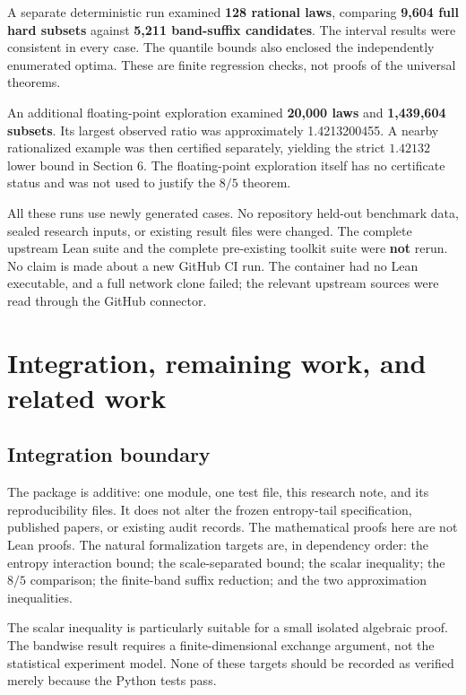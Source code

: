 \documentclass[
  11pt,
  a4paper,
]{article}
\begin{document}
A separate deterministic run examined \textbf{128 rational laws},
comparing \textbf{9,604 full hard subsets} against \textbf{5,211
band-suffix candidates}. The interval results were consistent in every
case. The quantile bounds also enclosed the independently enumerated
optima. These are finite regression checks, not proofs of the universal
theorems.

An additional floating-point exploration examined \textbf{20,000 laws}
and \textbf{1,439,604 subsets}. Its largest observed ratio was
approximately 1.4213200455. A nearby rationalized example was then
certified separately, yielding the strict \(1.42132\) lower bound in
Section 6. The floating-point exploration itself has no certificate
status and was not used to justify the \(8/5\) theorem.

All these runs use newly generated cases. No repository held-out
benchmark data, sealed research inputs, or existing result files were
changed. The complete upstream Lean suite and the complete pre-existing
toolkit suite were \textbf{not} rerun. No claim is made about a new
GitHub CI run. The container had no Lean executable, and a full network
clone failed; the relevant upstream sources were read through the GitHub
connector.

\section{Integration, remaining work, and related
work}\label{integration-remaining-work-and-related-work}

\subsection{Integration boundary}\label{integration-boundary}

The package is additive: one module, one test file, this research note,
and its reproducibility files. It does not alter the frozen entropy-tail
specification, published papers, or existing audit records. The
mathematical proofs here are not Lean proofs. The natural formalization
targets are, in dependency order: the entropy interaction bound; the
scale-separated bound; the scalar inequality; the \(8/5\) comparison;
the finite-band suffix reduction; and the two approximation
inequalities.

The scalar inequality is particularly suitable for a small isolated
algebraic proof. The bandwise result requires a finite-dimensional
exchange argument, not the statistical experiment model. None of these
targets should be recorded as verified merely because the Python tests
pass.
\end{document}

